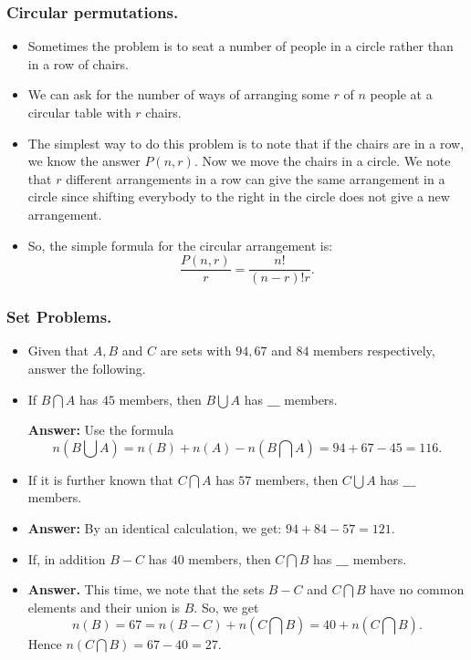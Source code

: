 %
\begin{frame}%
  \frametitle{Circular permutations.}
  \begin{itemize}%
\item Sometimes the problem is to seat a number of people in a circle
rather than in a row of chairs.

\item We can ask for the number of ways of arranging some $r$ of $n$
people at a circular table with $r$ chairs.

\item The simplest way to do this problem is to note that if the chairs
are in a row, we know the answer $P(n,r)$. Now we move the chairs in a
circle. We note that $r$ different arrangements in a row can give the
same arrangement in a circle since shifting everybody to the right in
the circle does not give a new arrangement.

\item So, the simple formula for the circular arrangement is:
$$\frac{P(n,r)}{r} = \frac{n!}{(n-r)!r}.$$

  
\end{itemize}
\end{frame}

%


\begin{frame}%
  \frametitle{Set Problems.}
  \begin{itemize}%
 
\item
Given that $A, B$ and $C$ are sets with $94, 67$ and $84$
members respectively, answer the following.

\item  If $B\bigcap A$ has $45$ members, then $B\bigcup A$ has
$\_\_\_$   members.

{\bf Answer:} Use the formula
$$n(B\bigcup A) = n(B) + n(A) - n(B\bigcap A) = 94+67-45 = 116.$$

\item If it is further known that $C\bigcap A$ has $57$ members, then
$C\bigcup A$ has $\_\_\_$   members.

\item
{\bf Answer:} By an identical calculation, we get: $94+84-57=121$.

\item If, in addition $B-C$ has $40$ members, then $C\bigcap B$ has 
$\_\_\_$   members.

\item {\bf Answer.} This time, we note that the sets $B-C$ and
$C\bigcap B$ have no common elements and their union is $B$.
So, we get
$$n(B) = 67 = n(B-C) + n(C\bigcap B) = 40+ n(C\bigcap B).$$
Hence $n(C\bigcap B) = 67-40 =27$.



\end{itemize}
\end{frame}

